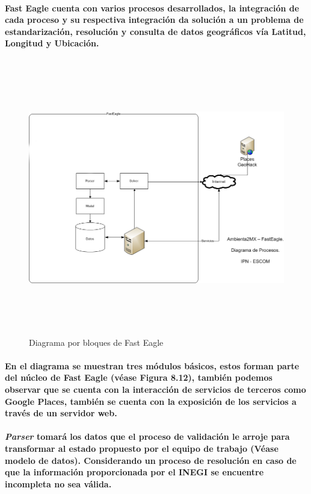     \paragraph{Fast Eagle cuenta con varios procesos desarrollados, la integración de cada proceso y su respectiva integración da solución a un problema de estandarización, resolución y consulta de datos geográficos vía Latitud, Longitud y Ubicación.}
    \newpage
      \begin{landscape}
        \begin{figure}[b!]
        \centering
        \includegraphics[width=22.5cm,height=12cm]{./images/DiagramaFastEagle}
        \caption{Diagrama por bloques de Fast Eagle}
      \end{figure}
      \end{landscape}
    \newpage
    \paragraph{En el diagrama se muestran tres módulos básicos, estos forman parte del núcleo de Fast Eagle (véase Figura 8.12), también podemos observar que se cuenta con la interacción de servicios de terceros como Google Places,  también se cuenta con la exposición de los servicios a través de un servidor web.}
    \paragraph{\textbf{\emph{Parser}} tomará los datos que el proceso de validación le arroje para transformar al estado propuesto por el equipo de trabajo (Véase modelo de datos). Considerando un proceso de resolución en caso de que la información proporcionada por el INEGI se encuentre incompleta no sea válida.}
